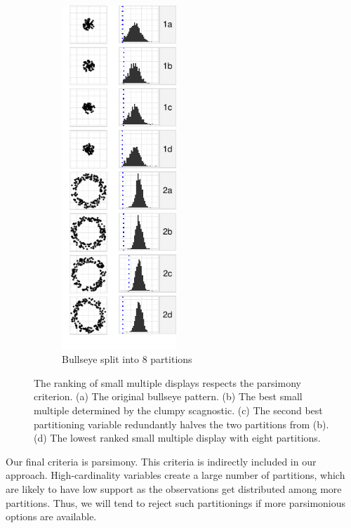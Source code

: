 \begin{figure}[t]
    \begin{subfigure}[b]{1.7in}
	\includegraphics[width=1.7in]{images/5_12851615653375-cluster2.pdf}
      \caption{Bullseye split into 8 partitions}
      \label{fig:pars4}
    \end{subfigure}
    \caption{The ranking of small multiple displays respects the parsimony criterion. (a) The original bullseye pattern. (b) The best small multiple determined by the clumpy scagnostic. (c) The second best partitioning variable redundantly halves the two partitions from (b). (d) The lowest ranked small multiple display with eight partitions.}
    \label{fig:parsimonious}
  \end{figure}

Our final criteria is parsimony. This criteria is indirectly included in our approach. High-cardinality variables create a large number of partitions, which are likely to have low support as the observations get distributed among more partitions. Thus, we will tend to reject such partitionings if more parsimonious options are available.
 

